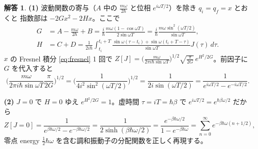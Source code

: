 \documentclass[dvipdfmx, uplatex]{jsarticle}
\theoremstyle{definition}
\newtheorem*{sol}{解答}
\begin{document}
\begin{sol}
\textbf{(1)} 波動関数の寄与（$A$ 中の $\frac{m\omega}{2\hbar}$ と位相 $e^{i\omega T/2}$）を除き $q_i=q_f=x$ とおくと
指数部は $-2Gx^2-2Hx$。ここで
\begin{align*}
    G&=A-\frac{m\omega}{2\hbar}+B
    =\frac{i}{\hbar}\frac{m\omega(1-\cos\omega T)}{2\sin\omega T}
    =\frac{i}{\hbar}\frac{m\omega\sin^2(\omega T/2)}{\sin\omega T},
    \\
    H&=C+D=\frac{1}{2i\hbar}\!\int_{t_i}^{t_i+T}\!\frac{\sin\omega(\tau-t_i)+\sin\omega(t_i+T-\tau)}{\sin\omega T}J(\tau)\,d\tau.
\end{align*}
$x$ の Fresnel 積分 \eqref{eq:fresnel} 1 回で
$Z[J]=\big(\frac{m\omega}{2\pi i\hbar\sin\omega T}\big)^{1/2}\sqrt{\frac{\pi}{2G}}\,e^{H^2/2G}$。前因子に $G$ を代入すると
\[
    \Big(\frac{m\omega}{2\pi i\hbar\sin\omega T}\frac{\pi}{2G}\Big)^{1/2}
    =\Big(\frac{1}{4i^2\sin^2(\omega T/2)}\Big)^{1/2}
    =\frac{1}{2i\sin(\omega T/2)}=\frac{1}{e^{i\omega T/2}-e^{-i\omega T/2}}.
\]

\par\smallskip
\textbf{(2)} $J=0$ で $H=0$ ゆえ $e^{H^2/2G}=1$。虚時間 $\tau=iT=\hbar\beta$ で $e^{i\omega T/2}=e^{\hbar\beta\omega/2}$ だから
\[
    Z[J=0]=\frac{1}{e^{\beta\hbar\omega/2}-e^{-\beta\hbar\omega/2}}
    =\frac{1}{2\sinh(\beta\hbar\omega/2)}
    =\frac{e^{-\beta\hbar\omega/2}}{1-e^{-\beta\hbar\omega}}
    =\sum_{n=0}^\infty e^{-\beta\hbar\omega(n+1/2)},
\]
零点 energy $\frac12\hbar\omega$ を含む調和振動子の分配関数を正しく再現する。
\end{sol}
\end{document}
